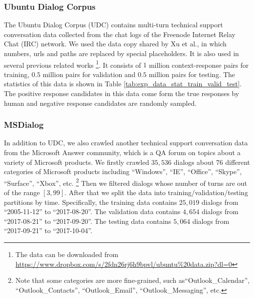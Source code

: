 \subsubsection{\textbf{Ubuntu Dialog Corpus}} The Ubuntu Dialog Corpus (UDC) \cite{DBLP:journals/corr/LowePSP15} contains multi-turn technical support conversation data collected from the chat logs of the Freenode Internet Relay Chat (IRC) network. We used the data copy shared by Xu et al.\cite{DBLP:journals/corr/XuLWSW16}, in which numbers, urls and paths are replaced by special placeholders. It is also used in several previous related works \cite{DBLP:conf/acl/WuWXZL17}\footnote{The data can be downloaded from \url{https://www.dropbox.com/s/2fdn26rj6h9bpvl/ubuntu\%20data.zip?dl=0}}. It consists of $1$ million context-response pairs for training, $0.5$ million pairs for validation and  $0.5$ million pairs for testing. The statistics of this data is shown in Table \ref{tab:exp_data_stat_train_valid_test}. The positive response candidates in this data come form the true responses by human and negative response candidates are randomly sampled. %

\subsubsection{\textbf{MSDialog}}
  In addition to UDC, we also crawled another technical support conversation data from the Microsoft Answer community, which is a QA forum on topics about a variety of Microsoft products. We firstly crawled $35,536$ dialogs about $76$ different categories of Microsoft products including ``Windows'', ``IE'', ``Office'', ``Skype'', ``Surface'', ``Xbox'', etc. \footnote{Note that some categories are more fine-grained, such as``Outlook\_Calendar'', ``Outlook\_Contacts'', ``Outlook\_Email'', ``Outlook\_Messaging'', etc.} Then we filtered dialogs whose number of turns are out of the range $[3,99]$. After that we split the data into training/validation/testing partitions by time. Specifically, the training data contains $25,019$ dialogs from ``2005-11-12'' to ``2017-08-20''. The validation data contains $4,654$ dialogs from ``2017-08-21'' to ``2017-09-20''. The testing data contains $5,064$ dialogs from ``2017-09-21'' to ``2017-10-04''. 
  

